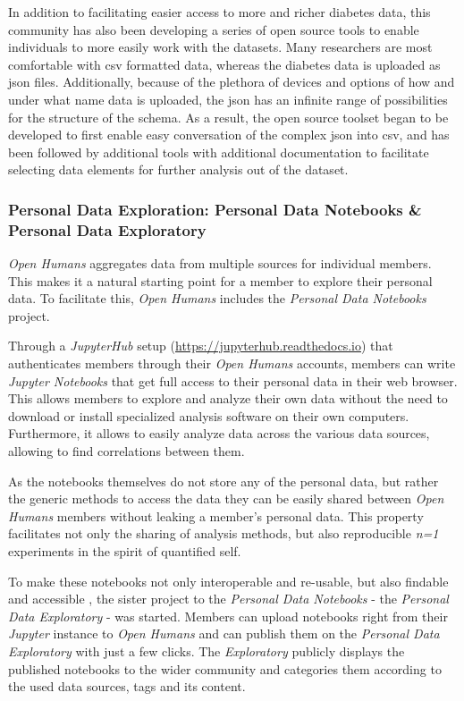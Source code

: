 \documentclass[a4paper,num-refs]{oup-contemporary}
\begin{document}
In addition to facilitating easier access to more and richer diabetes data, this community has also been developing a series of open source tools to enable individuals to more easily work with the datasets. Many researchers are most comfortable with csv formatted data, whereas the diabetes data is uploaded as json files. Additionally, because of the plethora of devices and options of how and under what name data is uploaded, the json has an infinite range of possibilities for the structure of the schema. As a result, the open source toolset began to be developed to first enable easy conversation of the complex json into csv, and has been followed by additional tools with additional documentation to facilitate selecting data elements for further analysis out of the dataset.

\subsubsection{Personal Data Exploration: Personal Data Notebooks \& Personal Data Exploratory}
\textit{Open Humans} aggregates data from multiple sources for individual members. This makes it a natural starting point for a member to explore their personal data. To facilitate this, \textit{Open Humans} includes the \textit{Personal Data Notebooks} project. 

Through a \textit{JupyterHub} setup (\url{https://jupyterhub.readthedocs.io}) that authenticates members through their \textit{Open Humans} accounts, members can write \textit{Jupyter Notebooks} \cite{Kluyver:2016aa} that get full access to their personal data in their web browser. This allows members to explore and analyze their own data without the need to download or install specialized analysis software on their own computers. Furthermore, it allows to easily analyze data across the various data sources, allowing to find correlations between them.

As the notebooks themselves do not store any of the personal data, but rather the generic methods to access the data they can be easily shared between \textit{Open Humans} members without leaking a member's personal data. This property facilitates not only the sharing of analysis methods, but also reproducible \textit{n=1} experiments in the spirit of quantified self.

To make these notebooks not only interoperable and re-usable, but also findable and accessible \cite{Wilkinson2016}, the sister project to the  \textit{Personal Data Notebooks} - the \textit{Personal Data Exploratory} -  was started. 
Members can upload notebooks right from their \textit{Jupyter} instance to \textit{Open Humans} and can publish them on the \textit{Personal Data Exploratory} with just a few clicks. The \textit{Exploratory} publicly displays the published notebooks to the wider community and categories them according to the used data sources, tags and its content.
\end{document}
